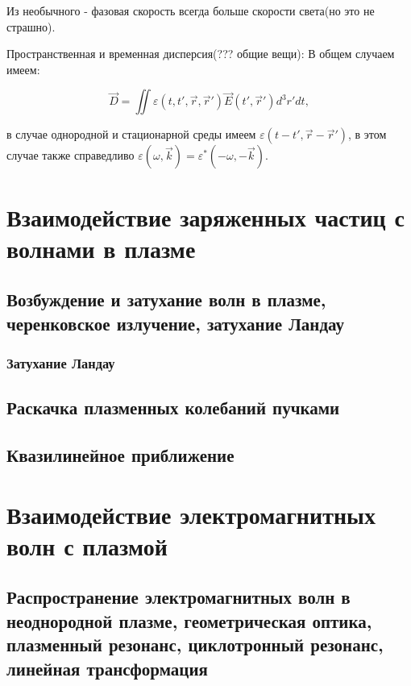\documentclass[10pt, a4paper]{article}
\let\stdsection\section
\renewcommand\section{\newpage\stdsection}
\begin{document}

Из необычного - фазовая скорость всегда больше скорости света(но это не страшно). 

Пространственная и временная дисперсия(??? общие вещи):
В общем случаем имеем:

\begin{equation}
    \overrightarrow{D}=\iint \varepsilon(t,t',\overrightarrow{r},\overrightarrow{r}') \overrightarrow{E}(t',\overrightarrow{r}') d^3 r' dt,
\end{equation}

в случае однородной и стационарной среды имеем $\varepsilon(t-t', \overrightarrow{r}-\overrightarrow{r}')$, в этом случае
также справедливо $\varepsilon(\omega, \overrightarrow{k})= \varepsilon^*(-\omega, -\overrightarrow{k})$.

\section{Взаимодействие заряженных частиц с волнами в плазме}

\subsection{Возбуждение и затухание волн в плазме, черенковское излучение, затухание Ландау}

\subsubsection{Затухание Ландау}
\label{subsubsec:Landau_damping}

\subsection{Раскачка плазменных колебаний пучками}

\subsection{Квазилинейное приближение}

\section{Взаимодействие электромагнитных волн с плазмой}

\subsection{Распространение электромагнитных волн в неоднородной плазме, геометрическая оптика, плазменный резонанс, циклотронный резонанс, линейная трансформация}
\end{document}

